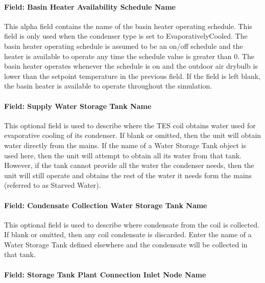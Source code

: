 \paragraph{Field: Basin Heater Availability Schedule Name}\label{field-basin-heater-availability-schedule-name}

This alpha field contains the name of the basin heater operating schedule. This field is only used when the condenser type is set to EvaporativelyCooled. The basin heater operating schedule is assumed to be an on/off schedule and the heater is available to operate any time the schedule value is greater than 0. The basin heater operates whenever the schedule is on and the outdoor air drybulb is lower than the setpoint temperature in the previous field. If the field is left blank, the basin heater is available to operate throughout the simulation.

\paragraph{Field: Supply Water Storage Tank Name}\label{field-supply-water-storage-tank-name-5-000}

This optional field is used to describe where the TES coil obtains water used for evaporative cooling of its condenser. If blank or omitted, then the unit will obtain water directly from the mains. If the name of a Water Storage Tank object is used here, then the unit will attempt to obtain all its water from that tank. However, if the tank cannot provide all the water the condenser needs, then the unit will still operate and obtains the rest of the water it needs form the mains (referred to as Starved Water).

\paragraph{Field: Condensate Collection Water Storage Tank Name}\label{field-condensate-collection-water-storage-tank-name-7}

This optional field is used to describe where condensate from the coil is collected. If blank or omitted, then any coil condensate is discarded. Enter the name of a Water Storage Tank defined elsewhere and the condensate will be collected in that tank.

\paragraph{Field: Storage Tank Plant Connection Inlet Node Name}\label{field-storage-tank-plant-connection-inlet-node-name}

